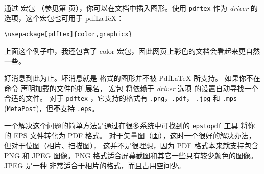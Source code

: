 通过  宏包
（参见第 \pageref{eps} 页），你可以在文档中插入图形。使用 \texttt{pdftex} 
作为 \emph{driver} 的选项，这个宏包也可用于 pdf\LaTeX{}：
\begin{code}
\begin{verbatim}
\usepackage[pdftex]{color,graphicx}
\end{verbatim}
\end{code}
上面这个例子中，我还包含了 color 宏包，因此网页上彩色的文档会看起来更自然一些。


好消息到此为止。坏消息就是 \EPSi{} 格式的图形并不被 Pdf\LaTeX{} 所支持。
如果你不在命令  声明加载的文件的扩展名，
宏包  将依赖于 \emph{driver} 选项
的设置自动寻找一个合适的文件。
对于 \texttt{pdftex} ，它支持的格式有 \texttt{.png}，\texttt{.pdf}，
\texttt{.jpg} 和 \texttt{.mps} (\texttt{MetaPost})，但{\textbf
不}支持 \texttt{.eps}。


一个解决这个问题的简单方法是通过在很多系统中可找到的 \texttt{epstopdf} 工具
将你的 EPS 文件转化为 PDF 格式。
对于矢量图（画），这时一个很好的解决办法，但对于位图（相片、扫描图），
这并不是很理想，因为 PDF 格式本来就支持包含 PNG 和 JPEG 图像。PNG 格式适合屏幕截图和其它一些只有较少颜色的图像。JPEG 是一种
非常适合于相片的格式，而且占用空间少。


